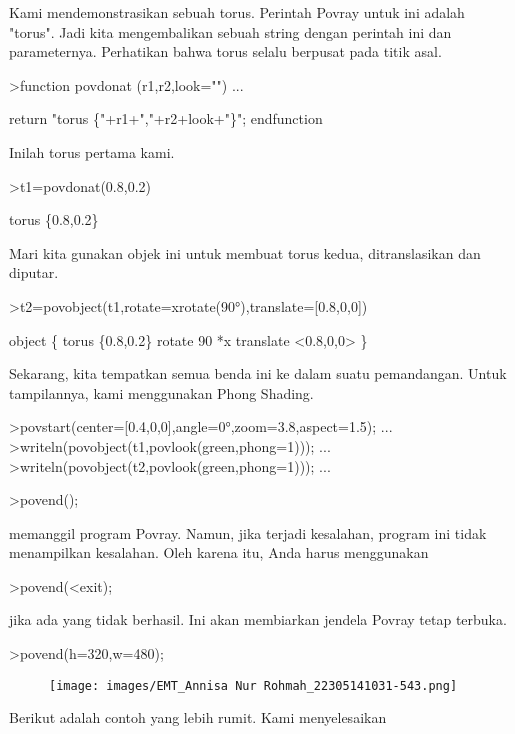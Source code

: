 \documentclass[a4paper,10pt]{article}
\begin{document}
\begin{eulernotebook}
\begin{eulercomment}
Kami mendemonstrasikan sebuah torus. Perintah Povray untuk ini adalah
"torus". Jadi kita mengembalikan sebuah string dengan perintah ini dan
parameternya. Perhatikan bahwa torus selalu berpusat pada titik asal.
\end{eulercomment}
\begin{eulerprompt}
>function povdonat (r1,r2,look="") ...
\end{eulerprompt}
\begin{eulerudf}
    return "torus \{"+r1+","+r2+look+"\}";
  endfunction
\end{eulerudf}
\begin{eulercomment}
Inilah torus pertama kami.
\end{eulercomment}
\begin{eulerprompt}
>t1=povdonat(0.8,0.2)
\end{eulerprompt}
\begin{euleroutput}
  torus \{0.8,0.2\}
\end{euleroutput}
\begin{eulercomment}
Mari kita gunakan objek ini untuk membuat torus kedua, ditranslasikan
dan diputar.
\end{eulercomment}
\begin{eulerprompt}
>t2=povobject(t1,rotate=xrotate(90°),translate=[0.8,0,0])
\end{eulerprompt}
\begin{euleroutput}
  object \{ torus \{0.8,0.2\}
   rotate 90 *x 
   translate <0.8,0,0>
   \}
\end{euleroutput}
\begin{eulercomment}
Sekarang, kita tempatkan semua benda ini ke dalam suatu pemandangan.
Untuk tampilannya, kami menggunakan Phong Shading.
\end{eulercomment}
\begin{eulerprompt}
>povstart(center=[0.4,0,0],angle=0°,zoom=3.8,aspect=1.5); ...
>writeln(povobject(t1,povlook(green,phong=1))); ...
>writeln(povobject(t2,povlook(green,phong=1))); ...
\end{eulerprompt}
\begin{eulerttcomment}
 >povend();
\end{eulerttcomment}
\begin{eulercomment}
memanggil program Povray. Namun, jika terjadi kesalahan, program ini
tidak menampilkan kesalahan. Oleh karena itu, Anda harus menggunakan

\textgreater{}povend(\textless{}exit);

jika ada yang tidak berhasil. Ini akan membiarkan jendela Povray tetap
terbuka.
\end{eulercomment}
\begin{eulerprompt}
>povend(h=320,w=480);
\end{eulerprompt}
\begin{figure}[h]
    \centering
    \texttt{[image: images/EMT\_Annisa Nur Rohmah\_22305141031-543.png]}
\end{figure}
\begin{eulercomment}
Berikut adalah contoh yang lebih rumit. Kami menyelesaikan


\end{eulercomment}
\end{eulernotebook}
\end{document}
